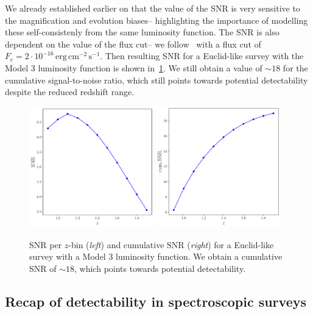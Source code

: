 We already established earlier on that the value of the SNR is very sensitive to the magnification and evolution biases-- highlighting the importance of modelling these self-consistenly from the same luminosity function. The SNR is also dependent on the value of the flux cut-- we follow~\cite{Euclid:2019clj} with a flux cut of $F_\mathrm{c} = 2 \cdot 10^{-16}\,\mathrm{erg}\,\mathrm{cm}^{-2}\,\mathrm{s}^{-1}$. Then resulting SNR for a Euclid-like survey with the Model 3 luminosity function is shown in~\ref{fig:snrmodel3}. We still obtain a value of $\sim 18$ for the cumulative signal-to-noise ratio, which still points towards potential detectability despite the reduced redshift range.
\begin{figure}[!ht]
    \centering
    \includegraphics[width=0.48\textwidth]{fig/model3_perzbin.pdf}
    \includegraphics[width=0.48\textwidth]{fig/model3_cum.pdf}
    \caption{SNR per $z$-bin (\emph{left}) and cumulative SNR (\emph{right}) for a Euclid-like survey with a Model 3 luminosity function. We obtain a cumulative SNR of $\sim 18$, which points towards potential detectability.}
    \label{fig:snrmodel3}
\end{figure}

\subsection{Recap of detectability in spectroscopic surveys}

